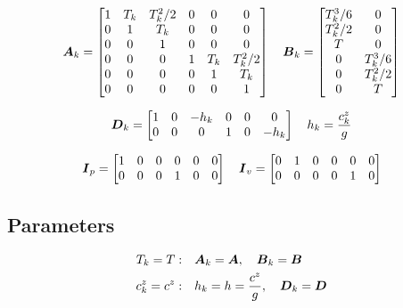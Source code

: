 \documentclass[12pt,a4paper]{article}
\begin{document}
\begin{equation*}
\mbox{\boldmath $A$}_k = 
\begin{bmatrix}
    1       & T_k   & T_k^2/2   & 0 & 0 & 0\\
    0       & 1     & T_k       & 0 & 0 & 0\\
    0       & 0     & 1         & 0 & 0 & 0\\
    0 & 0 & 0                   & 1       & T_k   & T_k^2/2   \\
    0 & 0 & 0                   & 0       & 1     & T_k       \\
    0 & 0 & 0                   & 0       & 0     & 1         \\
\end{bmatrix}
\quad
\mbox{\boldmath $B$}_k =
\begin{bmatrix}
    T_k^3/6 & 0\\
    T_k^2/2 & 0\\
    T       & 0\\
    0       & T_k^3/6 \\
    0       & T_k^2/2 \\
    0       & T       \\
\end{bmatrix}
\end{equation*}

\begin{equation*}
\mbox{\boldmath $D$}_{k} = 
\begin{bmatrix}
    1       & 0     & -h_k      & 0 & 0 & 0\\
    0 & 0 & 0                   & 1       & 0     & -h_k  \\
\end{bmatrix}
\quad
h_k = \frac{c^z_k}{g}
\end{equation*}

\begin{equation*}
\mbox{\boldmath $I$}_{p} = 
\begin{bmatrix} 
    1 & 0 & 0 & 0 & 0 & 0 \\
    0 & 0 & 0 & 1 & 0 & 0 
\end{bmatrix}
\quad
\mbox{\boldmath $I$}_{v} = 
\begin{bmatrix} 
    0 & 1 & 0 & 0 & 0 & 0 \\
    0 & 0 & 0 & 0 & 1 & 0 
\end{bmatrix}
\end{equation*}


\subsection{Parameters}
\begin{align*}
T_k = T:&
\quad
\mbox{\boldmath $A$}_k = \mbox{\boldmath $A$},
\quad
\mbox{\boldmath $B$}_k = \mbox{\boldmath $B$}\\
c^z_k = c^z:& 
\quad
h_k = h = \frac{c^z}{g},
\quad
\mbox{\boldmath $D$}_k = \mbox{\boldmath $D$}
\end{align*}
\end{document}
